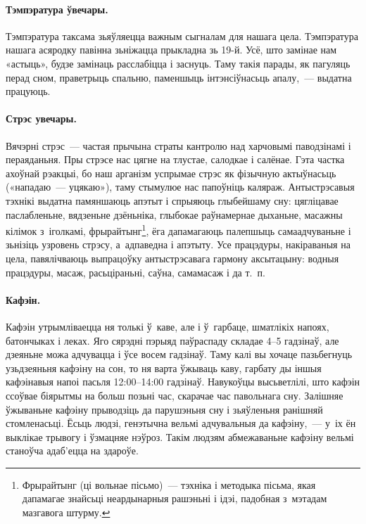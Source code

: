 \paragraph{Тэмпэратура ўвечары.}
Тэмпэратура таксама зьяўляецца важным сыгналам для нашага цела. Тэмпэратура нашага асяродку павінна зьніжацца прыкладна зь 19-й. Усё, што замінае нам «астыць», будзе замінаць расслабіцца і заснуць. Таму такія парады, як пагуляць перад сном, праветрыць спальню, паменшыць інтэнсіўнасьць апалу,~--- выдатна працуюць.

\paragraph{Стрэс увечары.}
Вячэрні стрэс~--- частая прычына страты кантролю над харчовымі паводзінамі і пераяданьня. Пры стрэсе нас цягне на тлустае, салодкае і салёнае. Гэта частка ахоўнай рэакцыі, бо наш арганізм успрымае стрэс як фізычную актыўнасьць («нападаю~--- уцякаю»), таму стымулюе нас папоўніць каляраж. Антыстрэсавыя тэхнікі выдатна памяншаюць апэтыт і спрыяюць глыбейшаму сну: цягліцавае паслабленьне, вядзеньне дзёньніка, глыбокае раўнамернае дыханьне, масажны кілімок з~іголкамі, фрырайтынг\footnote{Фрырайтынг (ці вольнае пісьмо)~--- тэхніка і методыка пісьма, якая дапамагае знайсьці неардынарныя рашэньні і ідэі, падобная з~мэтадам мазгавога штурму.}, ёга дапамагаюць палепшыць самаадчуваньне і зьнізіць узровень стрэсу, а~адпаведна і апэтыту. Усе працэдуры, накіраваныя на цела, павялічваюць выпрацоўку антыстрэсавага гармону аксытацыну: водныя працэдуры, масаж, расьціраньні, саўна, самамасаж і да т.~п.

\paragraph{Кафэін.}
Кафэін утрымліваецца ня толькі ў~каве, але і ў~гарбаце, шматлікіх напоях, батончыках і леках. Яго сярэдні пэрыяд паўраспаду складае 4--5 гадзінаў, але дзеяньне можа адчувацца і ўсе восем гадзінаў. Таму калі вы хочаце пазьбегнуць узьдзеяньня кафэіну на сон, то ня варта ўжываць каву, гарбату ды іншыя кафэінавыя напоі пасьля 12:00–14:00 гадзінаў. Навукоўцы высьветлілі, што кафэін ссоўвае біярытмы на больш позьні час, скарачае час павольнага сну. Залішняе ўжываньне кафэіну прыводзіць да парушэньня сну і зьяўленьня ранішняй стомленасьці. Ёсьць людзі, генэтычна вельмі адчувальныя да кафэіну,~--- у~іх ён выклікае трывогу і ўзмацняе нэўроз. Такім людзям абмежаваньне кафэіну вельмі станоўча адаб'ецца на здароўе.


